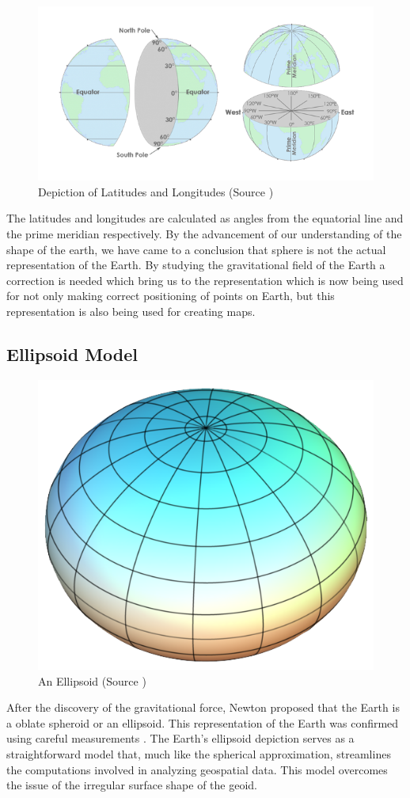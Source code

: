 \begin{figure}[h]
    \centering
    \includegraphics[width=0.7\linewidth]{figures/chapter-2/lat_lon.png}
    \caption{Depiction of Latitudes and Longitudes (Source \cite{GISGEO_LatLon}) }
    \label{fig:shpere-image}
\end{figure}

The latitudes and longitudes are calculated as angles from the equatorial line and the prime meridian respectively. By the advancement of our understanding of the shape of the earth, we have came to a conclusion that sphere is not the actual representation of the Earth. By studying the gravitational field of the Earth a
correction is needed which bring us to the representation which is now being used for not only making correct positioning of points on Earth, but this representation is also being used for creating maps.

\subsection{Ellipsoid Model}

\begin{figure}[h]
    \centering
    \includegraphics[width=0.4\linewidth]{figures/chapter-2/elipsoid.png}
    \caption{An Ellipsoid (Source \cite{GISGEO_Ellipsoid}) }
    \label{fig:ellipsoid-image}
\end{figure}
After the discovery of the gravitational force, Newton proposed that the Earth is a oblate spheroid or an ellipsoid. This representation of the Earth was confirmed using careful measurements \cite{Osserman2006-ys}. The Earth's ellipsoid depiction serves as a straightforward model that, much like the spherical approximation, streamlines the computations involved in analyzing geospatial data.
This model overcomes the issue of the irregular surface shape of the geoid.

